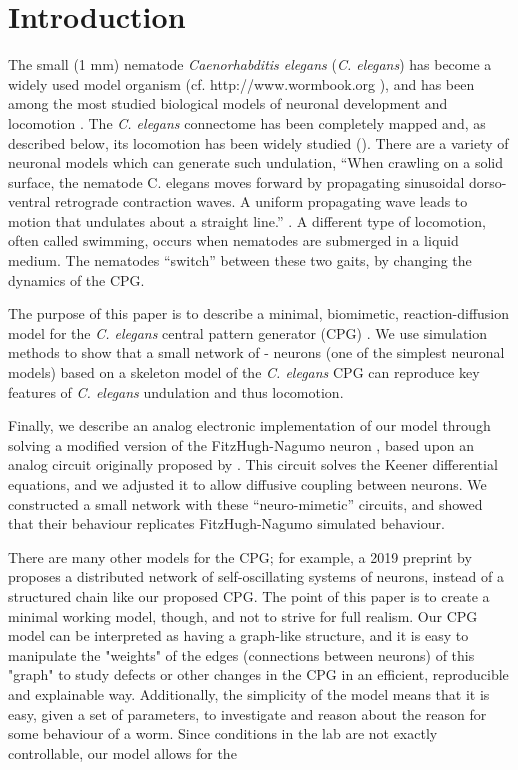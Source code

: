 \documentclass[
    11pt,
]{article}
\begin{document}
\section{Introduction}\label{sec: intro}

The small (1 mm) nematode \emph{Caenorhabditis elegans} (\emph{C. elegans}) has become a widely used model organism (cf. http://www.wormbook.org \cite{corsi2015}), and has been among the most studied biological models of neuronal development and locomotion \citep{katz2016, corsi2015}.
The \emph{C. elegans} connectome has been completely mapped \citep{jabr} and, as described below, its locomotion has been widely studied (\citet{corsi2015, gjorgjieva2014, }).  There are a variety of neuronal models which can generate such undulation,
``When crawling on a solid surface, the nematode C. elegans moves forward by propagating sinusoidal dorso-ventral retrograde contraction waves.  A uniform propagating wave leads to motion that undulates about a straight line.'' \citep{kim2011}.
A different type of locomotion, often called swimming, occurs when nematodes are submerged in a liquid medium. The nematodes “switch” between these two gaits, by changing the dynamics of the CPG.

The purpose of this paper is to describe a minimal, biomimetic, reaction-diffusion model for the \emph{C. elegans} central pattern generator (CPG) \citep{xu2018, wen2012}.  We use simulation methods to show that a small network of \citet{fitzhugh1955}-\citet{nagumo1962} neurons (one of the simplest neuronal models) based on a skeleton model of the \emph{C. elegans} CPG can reproduce key features of \emph{C. elegans} undulation \citep{magnes2012} and thus locomotion.

Finally, we describe an analog electronic implementation of our model through solving a modified version of the FitzHugh-Nagumo neuron \cite{fitzhugh1955}, based upon an analog circuit originally proposed by \citet{keener1983}.  This circuit solves the Keener differential equations, and we adjusted it to allow diffusive coupling between neurons.  We constructed a small network with these ``neuro-mimetic'' circuits, and showed that their behaviour replicates FitzHugh-Nagumo simulated behaviour.

There are many other models for the CPG; for example, a 2019 preprint by \cite{olivares2019} proposes a distributed network of self-oscillating systems of neurons, instead of a structured chain like our proposed CPG.  The point of this paper is to create a minimal working model, though, and not to strive for full realism.  Our CPG model can be interpreted as having a graph-like structure, and it is easy to manipulate the "weights" of the edges (connections between neurons) of this "graph" to study defects or other changes in the CPG in an efficient, reproducible and explainable way.  Additionally, the simplicity of the model means that it is easy, given a set of parameters, to investigate and reason about the reason for some behaviour of a worm.  Since conditions in the lab are not exactly controllable, our model allows for the 
\end{document}
